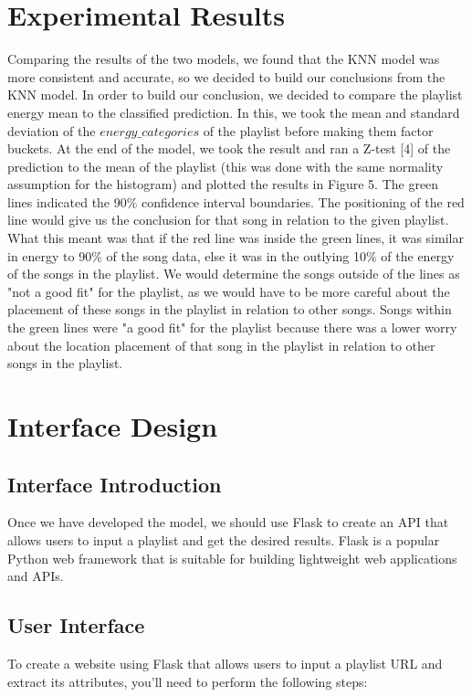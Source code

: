 \documentclass[titlepage]{article}
\begin{document}
\section{Experimental Results}
Comparing the results of the two models, we found that the KNN model was more consistent and accurate, so we decided to build our conclusions from the KNN model. In order to build our conclusion, we decided to compare the playlist energy mean to the classified prediction. In this, we took the mean and standard deviation of the $energy\_categories$ of the playlist before making them factor buckets. At the end of the model, we took the result and ran a Z-test [4] of the prediction to the mean of the playlist (this was done with the same normality assumption for the histogram) and plotted the results in Figure 5. The green lines indicated the 90\% confidence interval boundaries. The positioning of the red line would give us the conclusion for that song in relation to the given playlist. What this meant was that if the red line was inside the green lines, it was similar in energy to 90\% of the song data, else it was in the outlying 10\% of the energy of the songs in the playlist. We would determine the songs outside of the lines as "not a good fit" for the playlist, as we would have to be more careful about the placement of these songs in the playlist in relation to other songs. Songs within the green lines were "a good fit" for the playlist because there was a lower worry about the location placement of that song in the playlist in relation to other songs in the playlist.

\section{Interface Design}
\maketitle
\subsection{Interface Introduction}
Once we have developed the model, we should use Flask to create an API that allows users to input a playlist and get the desired results. Flask is a popular Python web framework that is suitable for building lightweight web applications and APIs.

\subsection{User Interface}
To create a website using Flask that allows users to input a playlist URL and extract its attributes, you'll need to perform the following steps:
\end{document}
